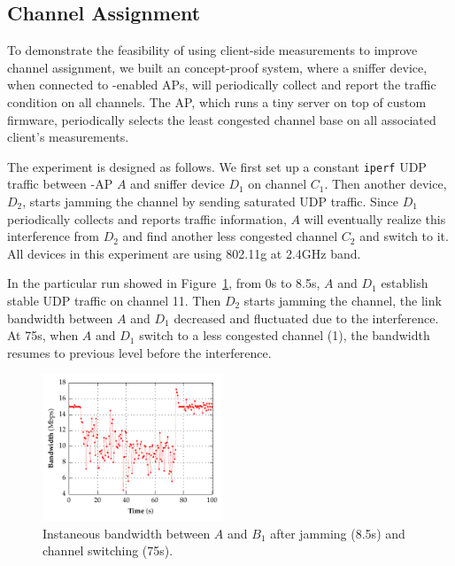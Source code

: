 \subsection{Channel Assignment}
\label{subsec-channel}

To demonstrate the feasibility of using client-side measurements to improve
channel assignment, we built an concept-proof system, where a sniffer device,
when connected to \PS{}-enabled APs, will periodically collect
and report the traffic condition on all channels. The AP, which runs a tiny 
server on top of custom firmware, periodically selects the least congested
channel base on all associated client's measurements.

The experiment is designed as follows. We first set up a constant \texttt{iperf}
UDP traffic between \PS{}-AP $A$ and sniffer device $D_1$ on channel
$C_1$. Then another device, $D_2$, starts jamming the channel by sending
saturated UDP traffic. Since $D_1$ periodically collects and reports traffic
information, $A$ will eventually realize this interference from $D_2$ and find
another less congested channel $C_2$ and switch to it. All devices in this
experiment are using 802.11g at 2.4GHz band. 

In the particular run showed in Figure~\ref{fig:bw}, from 0s to 8.5s, $A$ and
$D_1$ establish stable UDP traffic on channel 11. Then $D_2$ starts jamming the
channel, the link bandwidth between $A$ and $D_1$ decreased and fluctuated due
to the interference. At 75s, when $A$ and $D_1$ switch to a less congested
channel (1), the bandwidth resumes to previous level before the interference.

\begin{figure}[t!]
  \centering
  \includegraphics[width=0.48\textwidth]{./figures/ChannelBWGraph.pdf}
  \caption{Instaneous bandwidth between $A$ and $B_1$ after jamming (8.5s) and
  channel switching (75s).}
  \label{fig:bw}
\end{figure}
